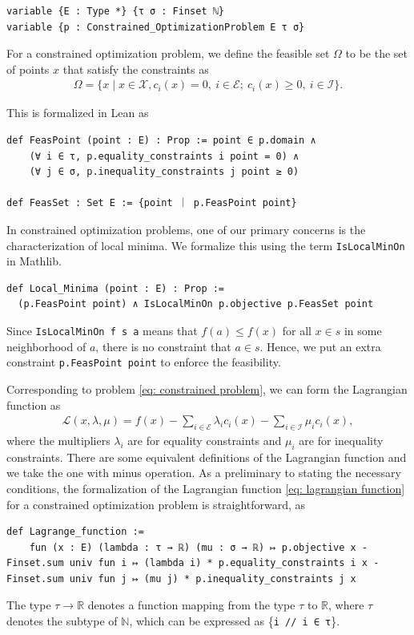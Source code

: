 \documentclass[sn-mathphys]{JORSC-jnl}%
\theoremstyle{thmstyleone}%
\theoremstyle{thmstylethree}%
\newcommand{\lean}[1]{\lstinline[language=lean, mathescape=true]{#1}}
\begin{document}
\begin{lstlisting}
variable {E : Type *} {τ σ : Finset ℕ} 
variable {p : Constrained_OptimizationProblem E τ σ}
\end{lstlisting}
For a constrained optimization problem, we define the feasible set $\Omega$ to be the set of points $x$ that satisfy the constraints as
\begin{align*}
    \Omega = \{x \mid x \in \mathcal{X},  c_i(x) = 0,\ i\in \mathcal{E};\ c_i(x) \geqslant 0,\ i\in \mathcal{I}\}.
\end{align*}

This is formalized in Lean as
\begin{lstlisting}
def FeasPoint (point : E) : Prop := point ∈ p.domain ∧
    (∀ i ∈ τ, p.equality_constraints i point = 0) ∧
    (∀ j ∈ σ, p.inequality_constraints j point ≥ 0)

def FeasSet : Set E := {point ｜ p.FeasPoint point}
\end{lstlisting}

In constrained optimization problems, one of our primary concerns is the characterization of local minima. We formalize this using the term \lean{IsLocalMinOn} in Mathlib.
\begin{lstlisting}
def Local_Minima (point : E) : Prop :=
  (p.FeasPoint point) ∧ IsLocalMinOn p.objective p.FeasSet point
\end{lstlisting}
Since \lean{IsLocalMinOn f s a} means that $f(a) \leq f(x)$ for all $x\in s$ in some neighborhood of $a$, there is no constraint that $a \in s$. Hence, we put an extra constraint \lean{p.FeasPoint point} to enforce the feasibility.

Corresponding to problem \eqref{eq: constrained problem}, we can form the Lagrangian function as
\begin{align}
    \mathcal{L}(x,\lambda,\mu) = f(x) - \sum_{i \in \mathcal{E}} \lambda_i c_i(x) - \sum_{i \in \mathcal{I}} \mu_i c_i(x),
    \label{eq: lagrangian function}
\end{align}
where the multipliers $\lambda_i$ are for equality constraints and $\mu_i$ are for inequality constraints. There are some equivalent definitions of the Lagrangian function and we take the one with minus operation. As a preliminary to stating the necessary conditions, the formalization of the Lagrangian function \eqref{eq: lagrangian function} for a constrained optimization problem is straightforward, as
\begin{lstlisting}
def Lagrange_function := 
    fun (x : E) (lambda : τ → ℝ) (mu : σ → ℝ) ↦ p.objective x - Finset.sum univ fun i ↦ (lambda i) * p.equality_constraints i x - Finset.sum univ fun j ↦ (mu j) * p.inequality_constraints j x
\end{lstlisting}
The type $\tau \to \mathbb{R}$ denotes a function mapping from the type $\tau$ to $\mathbb{R}$, where $\tau$ denotes the subtype of $\mathbb{N}$, which can be expressed as \{\lean{i // i ∈ τ}\}. 
\end{document}
